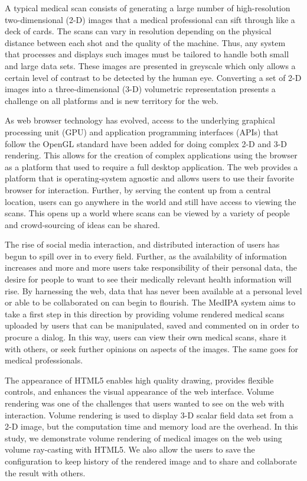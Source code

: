 \documentclass[annual]{acmsiggraph}
\begin{document}
A typical medical scan consists of generating a large number of high-resolution two-dimensional (2-D) images that a medical professional can sift through like a deck of cards.  The scans can vary in resolution depending on the physical distance between each shot and the quality of the machine.  Thus, any system that processes and displays such images must be tailored to handle both small and large data sets.  These images are presented in greyscale which only allows a certain level of contrast to be detected by the human eye.  Converting a set of 2-D images into a three-dimensional (3-D) volumetric representation presents a challenge on all platforms and is new territory for the web.

As web browser technology has evolved, access to the underlying graphical processing unit (GPU) and application programming interfaces (APIs) that follow the OpenGL standard have been added for doing complex 2-D and 3-D rendering.  This allows for the creation of complex applications using the browser as a platform that used to require a full desktop application.  The web provides a platform that is operating-system agnostic and allows users to use their favorite browser for interaction.  Further, by serving the content up from a central location, users can go anywhere in the world and still have access to viewing the scans.  This opens up a world where scans can be viewed by a variety of people and crowd-sourcing of ideas can be shared.

The rise of social media interaction, and distributed interaction of users has begun to spill over in to every field.  Further, as the availability of information increases and more and more users take responsibility of their personal data, the desire for people to want to see their medically relevant health information will rise.  By harnessing the web, data that has never been available at a personal level or able to be collaborated on can begin to flourish.  The MedIPA system aims to take a first step in this direction by providing volume rendered medical scans uploaded by users that can be manipulated, saved and commented on in order to procure a dialog.  In this way, users can view their own medical scans, share it with others, or seek further opinions on aspects of the images.  The same goes for medical professionals.

The appearance of HTML5 enables high quality drawing, provides flexible controls, and enhances the visual appearance of the web interface. Volume rendering was one of the challenges that users wanted to see on the web with interaction. Volume rendering is used to display 3-D scalar field data set from a 2-D image, but the computation time and memory load are the overhead. In this study, we demonstrate volume rendering of medical images on the web using volume ray-casting with HTML5. We also allow the users to save the configuration to keep history of the rendered image and to share and collaborate the result with others. 
\end{document}
